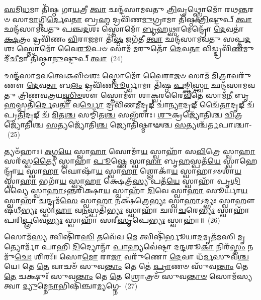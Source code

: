 {\anuvakamend[{𑌶𑌿\-\ul{𑌶𑍁}\-𑌰𑌿\-\ul{𑌨𑍍𑌦𑍍𑌰}\-𑌸𑍍𑌯𑍈𑌕᳴𑌚𑌤𑍍𑌵𑌾𑌰𑌿𑍞𑌶𑌚𑍍𑌚}]}%

\-\ul{𑌸}\-𑌮𑌿\-\ul{𑌧}\-𑌮𑌾 𑌤𑌿᳴𑌷𑍍𑌠 𑌗𑌾\-\ul{𑌯}\-𑌤𑍍𑌰𑍀 \ul{𑌤𑍍𑌵𑌾} 𑌛𑌨𑍍𑌦᳴𑌸𑌾𑌮𑌵𑌤𑍁 \ul{𑌤𑍍𑌰𑌿}\-𑌵𑍃𑌥𑍍𑌸𑍍𑌤𑍋𑌮𑍋᳴ 𑌰𑌥\-\ul{𑌨𑍍𑌤}\-𑌰𑍞 𑌸𑌾\-\ul{𑌮𑌾}\-𑌗𑍍𑌨𑌿\-\ul{𑌰𑍍𑌦𑍇}\-𑌵\-\ul{𑌤𑌾} 𑌬𑍍𑌰\-\ul{𑌹𑍍𑌮} 𑌦𑍍𑌰𑌵𑌿᳴𑌣\-\ul{𑌮𑍁}\-𑌗𑍍𑌰𑌾𑌮𑌾 𑌤𑌿᳴𑌷𑍍𑌠 \ul{𑌤𑍍𑌰𑌿}\-𑌷𑍍𑌟𑍁𑌪𑍍 \ul{𑌤𑍍𑌵𑌾} 𑌛𑌨𑍍𑌦᳴𑌸𑌾𑌮𑌵𑌤𑍁 𑌪𑌞𑍍𑌚\-\ul{𑌦}\-𑌶𑌃 𑌸𑍍𑌤𑍋𑌮𑍋᳴ \ul{𑌬𑍃}\-𑌹𑌥𑍍𑌸𑌾𑌮𑍇𑌨𑍍𑌦𑍍𑌰𑍋᳴ \ul{𑌦𑍇}\-𑌵𑌤𑌾॑ \ul{𑌕𑍍𑌷}\-𑌤𑍍𑌰𑌂 𑌦𑍍𑌰𑌵𑌿᳴𑌣𑌂 \ul{𑌵𑌿}\-𑌰𑌾\-\ul{𑌜}\-𑌮𑌾 𑌤𑌿᳴\-\ul{𑌷𑍍𑌠} 𑌜𑌗᳴𑌤𑍀 \ul{𑌤𑍍𑌵𑌾} 𑌛𑌨𑍍𑌦᳴𑌸𑌾𑌮𑌵𑌤𑍁 𑌸𑌪𑍍𑌤\-\ul{𑌦}\-𑌶𑌃 𑌸𑍍𑌤𑍋𑌮𑍋᳴ 𑌵𑍈\-\ul{𑌰𑍂}\-𑌪𑍞 𑌸𑌾𑌮᳴ \ul{𑌮}\-𑌰𑍁𑌤𑍋᳴ \ul{𑌦𑍇}\-𑌵\-\ul{𑌤𑌾} 𑌵𑌿𑌡𑍍𑌦𑍍𑌰𑌵𑌿᳴\-\ul{𑌣}\-𑌮𑍁𑌦𑍀᳴\-\ul{𑌚𑍀}\-𑌮𑌾 𑌤𑌿᳴𑌷𑍍𑌠𑌾\-\ul{𑌨𑍁}\-𑌷𑍍𑌟𑍁𑌪𑍍 \ul{𑌤𑍍𑌵𑌾}\-~(24)

𑌛𑌨𑍍𑌦᳴𑌸𑌾𑌮𑌵𑌤𑍍𑌵𑍇𑌕\-\ul{𑌵𑌿}\-\-\ul{𑍞}\-𑌶𑌃 𑌸𑍍𑌤𑍋𑌮𑍋᳴ 𑌵𑍈\-\ul{𑌰𑌾}\-𑌜𑍞 𑌸𑌾𑌮᳴ \ul{𑌮𑌿}\-𑌤𑍍𑌰𑌾𑌵𑌰𑍁᳴𑌣𑍗 \ul{𑌦𑍇}\-𑌵\-\ul{𑌤𑌾} 𑌬\-\ul{𑌲𑌂} 𑌦𑍍𑌰𑌵𑌿᳴𑌣\-\ul{𑌮𑍂}\-𑌰𑍍𑌧𑍍𑌵𑌾𑌮𑌾 𑌤𑌿᳴𑌷𑍍𑌠 \ul{𑌪}\-𑌙𑍍𑌕𑍍𑌤𑌿\-\ul{𑌸𑍍𑌤𑍍𑌵𑌾} 𑌛𑌨𑍍𑌦᳴𑌸𑌾𑌮𑌵𑌤𑍁 𑌤𑍍𑌰𑌿𑌣𑌵𑌤𑍍𑌰𑌯\-\ul{𑌸𑍍𑌤𑍍𑌰𑌿}\-\-\ul{𑍞}\-𑌶𑍗 𑌸𑍍𑌤𑍋𑌮𑍗᳴ 𑌶𑌾𑌕𑍍𑌵𑌰𑌰𑍈\-\ul{𑌵}\-𑌤𑍇 𑌸𑌾𑌮᳴\-\ul{𑌨𑍀} 𑌬𑍃\-\ul{𑌹}\-𑌸𑍍𑌪𑌤𑌿᳴\-\ul{𑌰𑍍𑌦𑍇}\-𑌵\-\ul{𑌤𑌾} 𑌵\-\ul{𑌰𑍍𑌚𑍋} 𑌦𑍍𑌰𑌵𑌿᳴𑌣\-\ul{𑌮𑍀}\-𑌦𑍃𑌙𑍍 𑌚𑌾॑\-\ul{𑌨𑍍𑌯𑌾}\-𑌦𑍃𑌙𑍍 𑌚𑍈᳴\-\ul{𑌤𑌾}\-𑌦𑍃𑌙𑍍 𑌚᳴ 𑌪𑍍𑌰\-\ul{𑌤𑌿}\-𑌦𑍃𑌙𑍍 𑌚᳴ \ul{𑌮𑌿}\-𑌤\-\ul{𑌶𑍍𑌚} 𑌸𑌮𑍍𑌮𑌿᳴𑌤\-\ul{𑌶𑍍𑌚} 𑌸𑌭᳴𑌰𑌾𑌃। \ul{𑌶𑍁}\-𑌕𑍍𑌰𑌜𑍍𑌯𑍋᳴𑌤𑌿𑌶𑍍𑌚 \ul{𑌚𑌿}\-𑌤𑍍𑌰𑌜𑍍𑌯𑍋᳴𑌤𑌿𑌶𑍍𑌚 \ul{𑌸}\-𑌤𑍍𑌯𑌜𑍍𑌯𑍋᳴𑌤𑌿\-\ul{𑌶𑍍𑌚} 𑌜𑍍𑌯𑍋𑌤𑌿᳴𑌷𑍍𑌮𑌾𑍟𑌶𑍍𑌚 \ul{𑌸}\-𑌤𑍍𑌯𑌶𑍍𑌚᳴\-\ul{𑌰𑍍𑌤}\-𑌪𑌾𑌶𑍍𑌚𑌾-~(25)

𑌤𑍍𑌯𑍞᳴𑌹𑌾𑌃। \ul{𑌅}\-𑌗𑍍𑌨\-\ul{𑌯𑍇} 𑌸𑍍𑌵𑌾\-\ul{𑌹𑌾} 𑌸𑍋𑌮𑌾᳴\-\ul{𑌯} 𑌸𑍍𑌵𑌾𑌹𑌾᳴ 𑌸\-\ul{𑌵𑌿}\-𑌤𑍍𑌰𑍇 𑌸𑍍𑌵𑌾\-\ul{𑌹𑌾} 𑌸𑌰᳴𑌸𑍍𑌵\-\ul{𑌤𑍍𑌯𑍈} 𑌸𑍍𑌵𑌾𑌹𑌾᳴ \ul{𑌪𑍂}\-𑌷𑍍𑌣𑍇 𑌸𑍍𑌵𑌾\-\ul{𑌹𑌾} 𑌬𑍃\-\ul{𑌹}\-𑌸𑍍𑌪𑌤᳴\-\ul{𑌯𑍇} 𑌸𑍍𑌵𑌾𑌹𑍇𑌨𑍍𑌦𑍍𑌰𑌾᳴\-\ul{𑌯} 𑌸𑍍𑌵𑌾\-\ul{𑌹𑌾} 𑌘𑍋𑌷𑌾᳴\-\ul{𑌯} 𑌸𑍍𑌵𑌾\-\ul{𑌹𑌾} 𑌶𑍍𑌲𑍋𑌕𑌾᳴\-\ul{𑌯} 𑌸𑍍𑌵𑌾𑌹𑌾\-𑌽𑍞𑌶𑌾᳴\-\ul{𑌯} 𑌸𑍍𑌵𑌾\-\ul{𑌹𑌾} 𑌭𑌗𑌾᳴\-\ul{𑌯} 𑌸𑍍𑌵𑌾\-\ul{𑌹𑌾} 𑌕𑍍𑌷𑍇𑌤𑍍𑌰᳴\-\ul{𑌸𑍍𑌯} 𑌪𑌤᳴\-\ul{𑌯𑍇} 𑌸𑍍𑌵𑌾𑌹𑌾᳴ 𑌪𑍃\-\ul{𑌥𑌿}\-𑌵𑍍𑌯𑍈 𑌸𑍍𑌵𑌾\-\ul{𑌹𑌾}\-\-𑌽𑌨𑍍𑌤𑌰𑌿᳴𑌕𑍍𑌷𑌾\-\ul{𑌯} 𑌸𑍍𑌵𑌾𑌹𑌾᳴ \ul{𑌦𑌿}\-𑌵𑍇 𑌸𑍍𑌵𑌾\-\ul{𑌹𑌾} 𑌸𑍂𑌰𑍍𑌯𑌾᳴\-\ul{𑌯} 𑌸𑍍𑌵𑌾𑌹𑌾᳴ \ul{𑌚}\-𑌨𑍍𑌦𑍍𑌰𑌮᳴\-\ul{𑌸𑍇} 𑌸𑍍𑌵𑌾\-\ul{𑌹𑌾} 𑌨𑌕𑍍𑌷᳴𑌤𑍍𑌰𑍇\-\ul{𑌭𑍍𑌯𑌃} 𑌸𑍍𑌵𑌾\-\ul{𑌹𑌾}\-\-𑌽𑌦𑍍𑌭𑍍𑌯𑌃 𑌸𑍍𑌵𑌾𑌹𑍗𑌷᳴𑌧𑍀\-\ul{𑌭𑍍𑌯𑌃} 𑌸𑍍𑌵𑌾\-\ul{𑌹𑌾} 𑌵\-\ul{𑌨}\-𑌸𑍍𑌪𑌤𑌿᳴\-\ul{𑌭𑍍𑌯𑌃} 𑌸𑍍𑌵𑌾𑌹𑌾᳴ 𑌚𑌰𑌾\-\ul{𑌚}\-𑌰𑍇\-\ul{𑌭𑍍𑌯𑌃} 𑌸𑍍𑌵𑌾𑌹𑌾᳴ 𑌪𑌰𑌿\-\ul{𑌪𑍍𑌲}\-𑌵𑍇\-\ul{𑌭𑍍𑌯𑌃} 𑌸𑍍𑌵𑌾𑌹𑌾᳴ 𑌸𑌰𑍀\-\ul{𑌸𑍃}\-𑌪𑍇\-\ul{𑌭𑍍𑌯𑌃} 𑌸𑍍𑌵𑌾𑌹𑌾॑॥~(26)

{\anuvakamend[{\-\ul{𑌅}\-\-\ul{𑌨𑍁}\-𑌷𑍍𑌟𑍁𑌪𑍍𑌤𑍍𑌵᳴\-\ul{𑌰𑍍𑌤}\-𑌪𑌾𑌶𑍍𑌚᳴ 𑌸𑌰𑍀\-\ul{𑌸𑍃}\-𑌪𑍇\-\ul{𑌭𑍍𑌯𑌃} 𑌸𑍍𑌵𑌾𑌹𑌾॑}]}%

𑌸𑍋𑌮᳴\-\ul{𑌸𑍍𑌯} 𑌤𑍍𑌵𑌿𑌷𑌿᳴𑌰\-\ul{𑌸𑌿} 𑌤𑌵𑍇᳴𑌵 \ul{𑌮𑍇} 𑌤𑍍𑌵𑌿𑌷𑌿᳴𑌰𑍍𑌭𑍂𑌯𑌾\-\ul{𑌦}\-𑌮𑍃𑌤᳴𑌮𑌸𑌿 \ul{𑌮𑍃}\-𑌤𑍍𑌯𑍋𑌰𑍍𑌮𑌾᳴ 𑌪𑌾𑌹𑌿 \ul{𑌦𑌿}\-𑌦𑍍𑌯𑍋𑌨𑍍𑌮𑌾᳴ \ul{𑌪𑌾}\-𑌹𑍍𑌯𑌵𑍇॑𑌷𑍍𑌟𑌾 𑌦\-\ul{𑌨𑍍𑌦}\-𑌶𑍂\-\ul{𑌕𑌾} 𑌨𑌿𑌰᳴\-\ul{𑌸𑍍𑌤𑌂} 𑌨𑌮𑍁᳴\-\ul{𑌚𑍇𑌃} 𑌶𑌿𑌰𑌃᳴॥ 𑌸𑍋\-\ul{𑌮𑍋} 𑌰𑌾\-\ul{𑌜𑌾} 𑌵𑌰𑍁᳴𑌣𑍋 \ul{𑌦𑍇}\-𑌵𑌾 𑌧᳴\-\ul{𑌰𑍍𑌮}\-𑌸𑍁𑌵᳴\-\ul{𑌶𑍍𑌚} 𑌯𑍇। 𑌤𑍇 \ul{𑌤𑍇} 𑌵𑌾𑌚𑍞᳴ 𑌸𑍁𑌵\-\ul{𑌨𑍍𑌤𑌾𑌂} 𑌤𑍇 𑌤𑍇॑ \ul{𑌪𑍍𑌰𑌾}\-𑌣𑍞 𑌸𑍁᳴𑌵\-\ul{𑌨𑍍𑌤𑌾𑌂} 𑌤𑍇 \ul{𑌤𑍇} 𑌚𑌕𑍍𑌷𑍁𑌃᳴ 𑌸𑍁𑌵\-\ul{𑌨𑍍𑌤𑌾𑌂} 𑌤𑍇 \ul{𑌤𑍇} 𑌶𑍍𑌰𑍋𑌤𑍍𑌰𑍞᳴ 𑌸𑍁𑌵\-\ul{𑌨𑍍𑌤𑌾}\-\-\ul{𑍞} 𑌸𑍋𑌮᳴𑌸𑍍𑌯 𑌤𑍍𑌵𑌾 \ul{𑌦𑍍𑌯𑍁}\-𑌮𑍍𑌨𑍇\-\ul{𑌨𑌾}\-𑌭𑌿𑌷𑌿᳴𑌞𑍍𑌚𑌾\-\ul{𑌮𑍍𑌯}\-𑌗𑍍𑌨𑍇-~(27)

